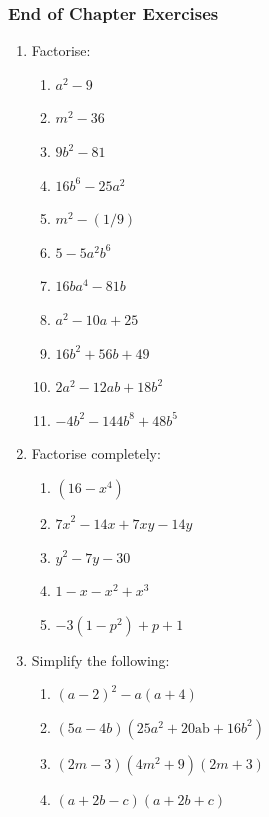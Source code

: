             \subsubsection{ End of Chapter Exercises}
            \nopagebreak
      \label{m39392*id281011}\begin{enumerate}[noitemsep, label=\textbf{\arabic*}. ] 
            \label{m39392*uid55}\item Factorise:
\label{m39392*id281026}\begin{enumerate}[noitemsep, label=\textbf{\alph*}. ] 
            \item ${a}^{2}-9$\item ${m}^{2}-36$\item $9{b}^{2}-81$\item $16{b}^{6}-25{a}^{2}$\item ${m}^{2}-\left(1/9\right)$\item $5-5{a}^{2}{b}^{6}$\item $16b{a}^{4}-81b$\item ${a}^{2}-10a+25$\item $16{b}^{2}+56b+49$\item $2{a}^{2}-12ab+18{b}^{2}$\item $-4{b}^{2}-144{b}^{8}+48{b}^{5}$\end{enumerate}
                \label{m39392*id632}\item Factorise completely: \label{m39392*id6423}\begin{enumerate}[noitemsep, label=\textbf{\alph*}. ] 
            \item $\left(16-{x}^{4}\right)$\item ${7x}^{2}-14x+7xy-14y$
\item ${y}^{2}-7y-30$
\item $1-x-{x}^{2}+{x}^{3}$
\item $-3\left(1-{p}^{2}\right)+p+1$\end{enumerate}
\item Simplify the following:
\label{m39392*eip-id1166762435067}\begin{enumerate}[noitemsep, label=\textbf{\alph*}. ] 
            \item ${\left(a-2\right)}^{2}-a\left(a+4\right)$\item $\left(5a-4b\right)\left(25{a}^{2}+20\mathrm{ab}+16{b}^{2}\right)$\item $\left(2m-3\right)\left(4{m}^{2}+9\right)\left(2m+3\right)$\item $\left(a+2b-c\right)\left(a+2b+c\right)$\end{enumerate}

\end{enumerate}

